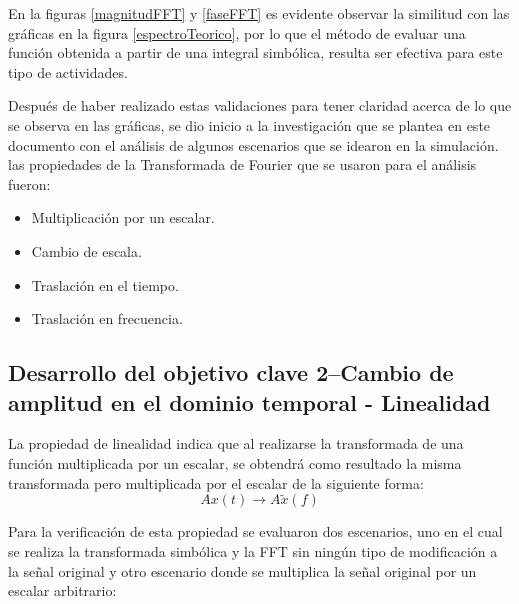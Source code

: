 \documentclass[11pt,letterpaper,twocolumn]{article}
\begin{document}
        \vspace{-5mm}
        
        En la figuras \ref{magnitudFFT} y \ref{faseFFT} es evidente observar la similitud con las gráficas en
        la figura \ref{espectroTeorico}, por lo que el método de evaluar una función obtenida a partir de una 
        integral simbólica, resulta ser efectiva para este tipo de actividades.
        
        Después de haber realizado estas validaciones para tener claridad acerca de lo que se 
        observa en las gráficas, se dio inicio a la investigación que se plantea en este documento
        con el análisis de algunos escenarios que se idearon en la simulación. las propiedades de 
        la Transformada de Fourier que se usaron para el análisis fueron:
        
        \begin{itemize}
            \item Multiplicación por un escalar.
            \item Cambio de escala.
            \item Traslación en el tiempo.
            \item Traslación en frecuencia.
        \end{itemize}
        
    \subsection{Desarrollo del objetivo clave 2--Cambio de amplitud en el dominio temporal - Linealidad}
        La propiedad de linealidad indica que al realizarse la transformada de una función multiplicada por un escalar, se obtendrá como resultado la misma transformada pero multiplicada por el escalar de la siguiente forma: 
        \begin{equation}
            A{x}(t) \rightarrow A\tilde{x}(f)
            \label{Linearidad}
        \end{equation}
        
        Para la verificación de esta propiedad se evaluaron dos escenarios, uno en el cual se realiza la transformada simbólica y la FFT sin ningún tipo de modificación a la señal original y otro escenario donde se multiplica la señal original por un escalar arbitrario:
        
\end{document}
